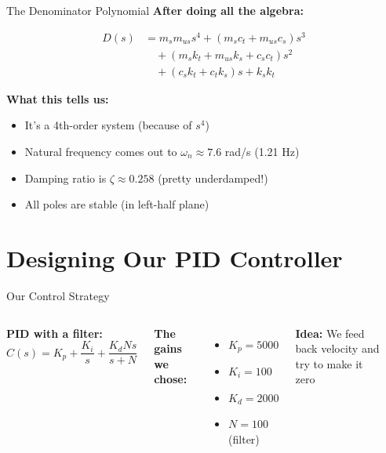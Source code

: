 \documentclass[aspectratio=169]{beamer}
\begin{document}
\begin{frame}{The Denominator Polynomial}
  \textbf{After doing all the algebra:}
  
  \small
  \begin{align}
    D(s) &= m_s m_{us} s^4 + (m_s c_t + m_{us} c_s)s^3 \nonumber \\
    &\quad + (m_s k_t + m_{us} k_s + c_s c_t)s^2 \nonumber \\
    &\quad + (c_s k_t + c_t k_s)s + k_s k_t
  \end{align}
  \normalsize
  
  \vspace{0.3cm}
  
  \textbf{What this tells us:}
  \begin{itemize}
    \item It's a 4th-order system (because of $s^4$)
    \item Natural frequency comes out to $\omega_n \approx 7.6$ rad/s (1.21 Hz)
    \item Damping ratio is $\zeta \approx 0.258$ (pretty underdamped!)
    \item All poles are stable (in left-half plane)
  \end{itemize}
\end{frame}

\section{Designing Our PID Controller}

\begin{frame}{Our Control Strategy}
  \begin{columns}
    \textbf{PID with a filter:}
    \begin{equation}
      C(s) = K_p + \frac{K_i}{s} + \frac{K_d N s}{s + N}
    \end{equation}
    
    \textbf{The gains we chose:}
    \begin{itemize}
      \item $K_p = 5000$
      \item $K_i = 100$
      \item $K_d = 2000$
      \item $N = 100$ (filter)
    \end{itemize}
    
    \textbf{Idea:} We feed back velocity and try to make it zero
    
    \begin{center}
      
    \end{center}
  \end{columns}
\end{frame}
\end{document}
